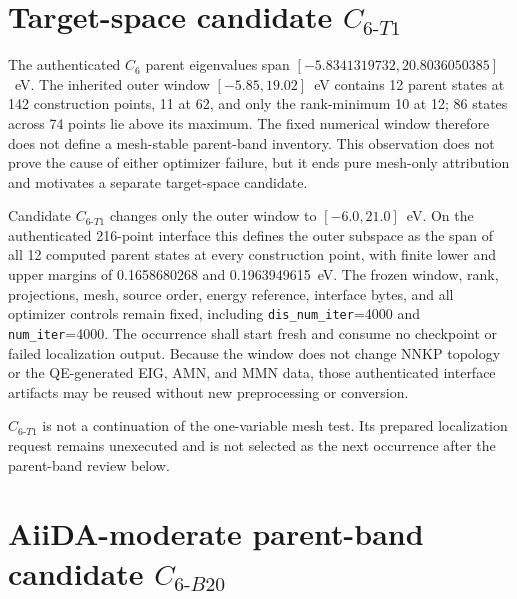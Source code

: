 \documentclass[11pt]{report}
\begin{document}
\section{Target-space candidate \texorpdfstring{$C_{6\text{-}T1}$}{C6-T1}}

The authenticated $C_6$ parent eigenvalues span
$[-5.8341319732,20.8036050385]$~eV.  The inherited outer window
$[-5.85,19.02]$~eV contains 12 parent states at 142 construction points, 11 at 62,
and only the rank-minimum 10 at 12; 86 states across 74 points lie above its maximum.
The fixed numerical window therefore does not define a mesh-stable parent-band
inventory.  This observation does not prove the cause of either optimizer failure, but
it ends pure mesh-only attribution and motivates a separate target-space candidate.

Candidate $C_{6\text{-}T1}$ changes only the outer window to
$[-6.0,21.0]$~eV.  On the authenticated 216-point interface this defines the outer
subspace as the span of all 12 computed parent states at every construction point, with
finite lower and upper margins of 0.1658680268 and 0.1963949615~eV.  The frozen window,
rank, projections, mesh, source order, energy reference, interface bytes, and all
optimizer controls remain fixed, including \texttt{dis\_num\_iter}=4000 and
\texttt{num\_iter}=4000.  The occurrence shall start fresh and consume no checkpoint or
failed localization output.  Because the window does not change NNKP topology or the
QE-generated EIG, AMN, and MMN data, those authenticated interface artifacts may be
reused without new preprocessing or conversion.

$C_{6\text{-}T1}$ is not a continuation of the one-variable mesh test.  Its prepared
localization request remains unexecuted and is not selected as the next occurrence after
the parent-band review below.

\section{AiiDA-moderate parent-band candidate
\texorpdfstring{$C_{6\text{-}B20}$}{C6-B20}}
\end{document}
